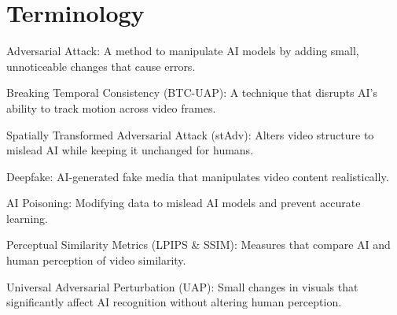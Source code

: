 \section{Terminology}
\label{section:terminology}

Adversarial Attack: A method to manipulate AI models by adding small, unnoticeable changes that cause errors.

Breaking Temporal Consistency (BTC-UAP): A technique that disrupts AI’s ability to track motion across video frames.

Spatially Transformed Adversarial Attack (stAdv): Alters video structure to mislead AI while keeping it unchanged for humans.

Deepfake: AI-generated fake media that manipulates video content realistically.

AI Poisoning: Modifying data to mislead AI models and prevent accurate learning.

Perceptual Similarity Metrics (LPIPS \& SSIM): Measures that compare AI and human perception of video similarity.

Universal Adversarial Perturbation (UAP): Small changes in visuals that significantly affect AI recognition without altering human perception.